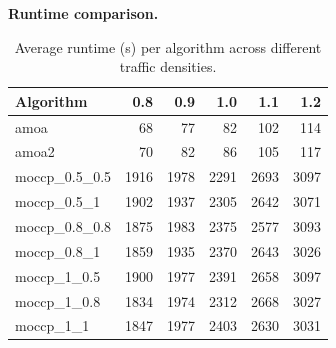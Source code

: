 \documentclass{article}
\begin{document}
\vspace{0.5em}
\textbf{Runtime comparison.}
\vspace{0.5em}



\begin{table}[htbp]
\centering
\caption{Average runtime (s) per algorithm across different traffic densities.}
\label{tab:avg_runtime_all}
\normalsize
\begin{tabular}{l r r r r r}
\toprule
\textbf{Algorithm} & \textbf{0.8} & \textbf{0.9} & \textbf{1.0} & \textbf{1.1} & \textbf{1.2} \\
\midrule
amoa             & \num{68} & \num{77} & \num{82} & \num{102} & \num{114} \\
amoa2            & \num{70} & \num{82} & \num{86} & \num{105} & \num{117} \\
moccp\_0.5\_0.5  & \num{1916} & \num{1978} & \num{2291} & \num{2693} & \num{3097}  \\
moccp\_0.5\_1  & \num{1902} & \num{1937} & \num{2305} & \num{2642} & \num{3071} \\
moccp\_0.8\_0.8  & \num{1875} & \num{1983} & \num{2375} & \num{2577} & \num{3093} \\
moccp\_0.8\_1    & \num{1859} & \num{1935} & \num{2370} & \num{2643} & \num{3026}  \\
moccp\_1\_0.5    & \num{1900} & \num{1977} & \num{2391} & \num{2658} & \num{3097} \\
moccp\_1\_0.8    & \num{1834} & \num{1974} & \num{2312} & \num{2668} & \num{3027} \\
moccp\_1\_1    & \num{1847} & \num{1977} & \num{2403} & \num{2630} & \num{3031} \\

\bottomrule
\end{tabular}
\end{table}
\end{document}
